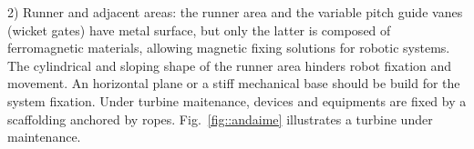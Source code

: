 

2) Runner and adjacent areas: the runner area and the
variable pitch guide vanes (wicket gates) have metal surface, but only the
latter is composed of ferromagnetic materials, allowing magnetic fixing
solutions for robotic systems. The cylindrical and sloping shape of the runner
area hinders robot fixation and movement. An horizontal plane or a stiff
mechanical base should be build for the system fixation.
Under turbine maitenance, devices and equipments are fixed by a scaffolding
anchored by ropes. Fig.~\ref{fig::andaime} illustrates a turbine under
maintenance.


